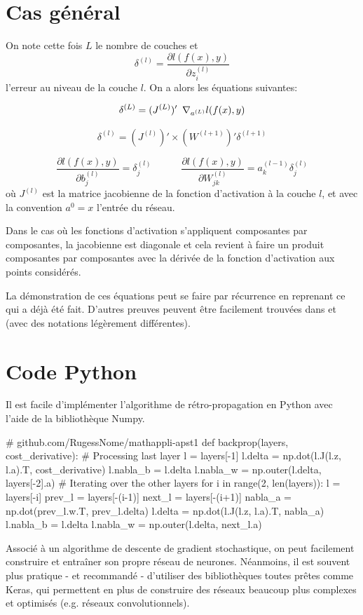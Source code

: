 \documentclass[ebook,10pt,oneside,openany,final, french, a4paper]{memoir}
\begin{document}
\begin{multicols*}{2}[]
\chapter{Cas général}

On note cette fois $L$ le nombre de couches et 
\[
\delta^{(l)} = \frac{\partial l(f(x), y)}{\partial z^{(l)}_i}
\]
l'erreur au niveau de la couche $l$.
On a alors les équations suivantes:

\[
\delta^{(L)} = (J^{(L)})' \enskip \nabla_{a^{(L)}} l(f(x), y)
\]

\[
\delta^{(l)} = (J^{(l)})' \times  (W^{(l+1)})' \delta^{(l+1)} 
\]

\[
\frac{\partial l(f(x), y)}{\partial b^{(l)}_j} = \delta^{(l)}_j
\qquad \quad
\frac{\partial l(f(x), y)}{\partial W^{(l)}_{jk}} = a^{(l-1)}_{k} \delta^{(l)}_{j}
\]
où  $J^(l)$ est la matrice jacobienne de la fonction d'activation 
à la couche $l$, et avec la convention $a^{0} = x$ l'entrée du 
réseau.

Dans le cas où les fonctions d'activation s'appliquent composantes 
par composantes, la jacobienne est diagonale et cela revient à 
faire un produit composantes par composantes avec la dérivée de la 
fonction d'activation aux points considérés.

La démonstration de ces équations peut se faire par récurrence en 
reprenant ce qui a déjà été fait.
D'autres preuves peuvent être facilement trouvées dans \cite{neuralnetworksanddeeplearning} 
et \cite{WikiStatNN} (avec des notations légèrement différentes).


\chapter{Code Python}

Il est facile d'implémenter l'algorithme de rétro-propagation en 
Python avec l'aide de la bibliothèque Numpy.

\begin{codeblock}
# github.com/RugessNome/mathappli-apst1
def backprop(layers, cost_derivative):
  # Processing last layer
  l = layers[-1]
  l.delta = np.dot(l.J(l.z, l.a).T, cost_derivative)
  l.nabla_b = l.delta
  l.nabla_w = np.outer(l.delta, layers[-2].a)
  # Iterating over the other layers
  for i in range(2, len(layers)):
    l = layers[-i]
    prev_l = layers[-(i-1)]
    next_l = layers[-(i+1)]
    nabla_a = np.dot(prev_l.w.T, prev_l.delta)
    l.delta = np.dot(l.J(l.z, l.a).T, nabla_a)
    l.nabla_b = l.delta
    l.nabla_w = np.outer(l.delta, next_l.a)
\end{codeblock}

Associé à un algorithme de descente de gradient stochastique, 
on peut facilement construire et entraîner son propre 
réseau de neurones. 
Néanmoins, il est souvent plus pratique - et recommandé - d'utiliser 
des bibliothèques toutes prêtes comme Keras, qui permettent en plus 
de construire des réseaux beaucoup plus complexes et optimisés (e.g.\/ 
réseaux convolutionnels).

 


\end{multicols*}
\end{document}
